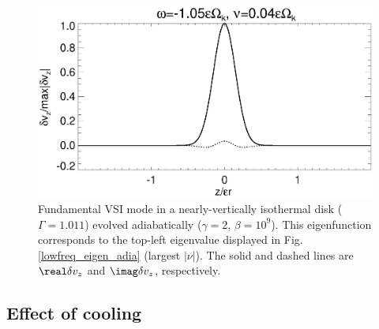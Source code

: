 \begin{figure}
  \includegraphics[width=\linewidth]{figures/eigenvectorvz_adia}
  \caption{Fundamental VSI mode in a nearly-vertically
    isothermal disk ($\Gamma=1.011$) evolved adiabatically
    ($\gamma=2$, $\beta=10^9$). This eigenfunction 
    corresponds to the top-left eigenvalue displayed in 
    Fig. \ref{lowfreq_eigen_adia} (largest $|\nu|$).  
    The solid and dashed lines are $\real \delta v_z$ and $\imag
    \delta v_z$, respectively.  
    \label{lowfreq_eigenfunc_adia}
  }
\end{figure}

\subsection{Effect of cooling} 